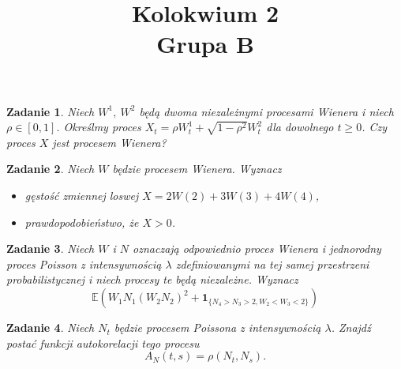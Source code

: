 \documentclass{mwart}
\title{Kolokwium 2\\Grupa B}
\newtheorem{zd}{Zadanie}
\begin{document}

\maketitle
\begin{zd}
Niech $W^1,\ W^2$ będą dwoma niezależnymi procesami Wienera i niech $\rho \in [0, 1]$. Określmy proces $X_t = \rho W_t^1 + \sqrt{1 - \rho^2}W^2_t$ dla dowolnego $t\geq 0$. Czy proces $X$ jest procesem Wienera?
\end{zd}

\begin{zd}
Niech $W$ będzie procesem Wienera. Wyznacz
\begin{itemize}
\item gęstość zmiennej loswej $X = 2W(2) + 3W(3) + 4W(4)$,
\item prawdopodobieństwo, że $X > 0$.
\end{itemize}
\end{zd}

\begin{zd}
Niech $W$ i $N$ oznaczają odpowiednio proces Wienera i jednorodny proces Poisson z intensywnością $\lambda$ zdefiniowanymi na tej samej przestrzeni probabilistycznej i niech procesy te będą niezależne. Wyznacz
\begin{displaymath}
\mathbb{E}\left(W_1N_1(W_2N_2)^2 + \pmb{1}_{\{N_4 > N_3 > 2, W_2 < W_3 < 2\}}\right)
\end{displaymath}
\end{zd}

\begin{zd}
Niech $N_t$ będzie procesem Poissona z intensywnością $\lambda$. Znajdź postać funkcji  autokorelacji tego procesu
\begin{displaymath}
	A_N(t,s) = \rho\left(N_t, N_s\right).
\end{displaymath}
\end{zd}
\end{document}
